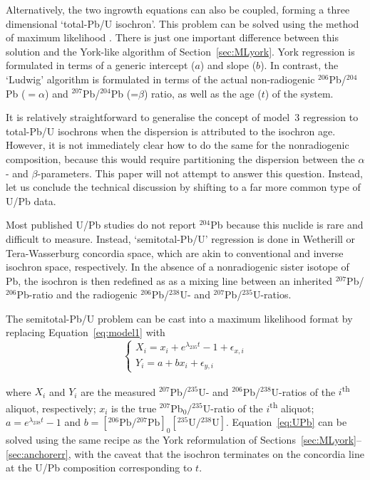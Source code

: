 \documentclass{article}
\begin{document}
Alternatively, the two ingrowth equations can also be coupled, forming
a three dimensional `total-Pb/U isochron'. This problem can be solved
using the method of maximum likelihood \citep{ludwig1998}. There is
just one important difference between this solution and the York-like
algorithm of Section~\ref{sec:MLyork}. York regression is formulated
in terms of a generic intercept ($a$) and slope ($b$). In contrast,
the `Ludwig' algorithm is formulated in terms of the actual
non-radiogenic $^{206}$Pb/$^{204}$Pb ($=\alpha$) and
$^{207}$Pb/$^{204}$Pb (=$\beta$) ratio, as well as the age ($t$) of
the system.\medskip

It is relatively straightforward to generalise the concept of model~3
regression to total-Pb/U isochrons when the dispersion is attributed
to the isochron age. However, it is not immediately clear how to do the
same for the nonradiogenic composition, because this would require
partitioning the dispersion between the $\alpha$- and
$\beta$-parameters. This paper will not attempt to answer this
question. Instead, let us conclude the technical discussion by
shifting to a far more common type of U/Pb data.\medskip

Most published U/Pb studies do not report $^{204}$Pb because this
nuclide is rare and difficult to measure. Instead, `semitotal-Pb/U'
regression is done in Wetherill or Tera-Wasserburg concordia space,
which are akin to conventional and inverse isochron space,
respectively. In the absence of a nonradiogenic sister isotope of Pb,
the isochron is then redefined as as a mixing line between an
inherited ${}^{207}$Pb/${}^{206}$Pb-ratio and the radiogenic
${}^{206}$Pb/${}^{238}$U- and ${}^{207}$Pb/${}^{235}$U-ratios.\medskip

The semitotal-Pb/U problem can be cast into a maximum likelihood
format by replacing Equation~\ref{eq:model1} with
\begin{equation}
  \begin{cases}
    X_i = x_i + e^{\lambda_{235}t} - 1 + \epsilon_{x,i} \\
    Y_i = a + b x_i + \epsilon_{y,i}
  \end{cases}
  \label{eq:UPb}
\end{equation}

\noindent where $X_i$ and $Y_i$ are the measured
${}^{207}$Pb/${}^{235}$U- and ${}^{206}$Pb/${}^{238}$U-ratios of the
$i$\textsuperscript{th} aliquot, respectively; $x_i$ is the true
${}^{207}$Pb$_0/{}^{235}$U-ratio of the $i$\textsuperscript{th}
aliquot; $a = e^{\lambda_{238}t}-1$ and
$b = [{}^{206}\mbox{Pb}/{}^{207}\mbox{Pb}]_0[{}^{235}\mbox{U}/{}^{238}\mbox{U}]$.
Equation~\ref{eq:UPb} can be solved using the same recipe as the York
reformulation of Sections~\ref{sec:MLyork}--\ref{sec:anchorerr}, with
the caveat that the isochron terminates on the concordia line at the U/Pb
composition corresponding to $t$.\medskip
\end{document}
